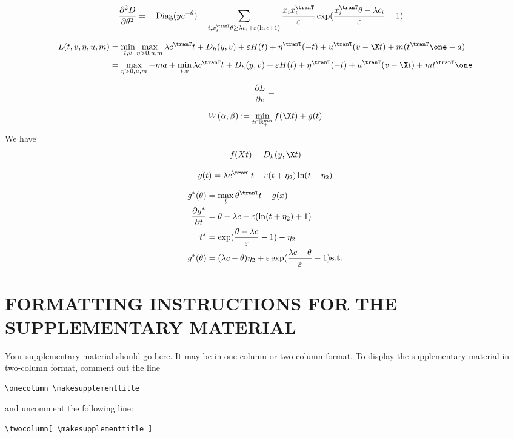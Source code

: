 $$
\begin{aligned}
\frac{\partial^{2} D}{\partial \theta^{2}} &=  -\operatorname{Diag}(ye^{-\theta}) -  \sum_{i,x_i^{\tranT}\theta\geq\lambda c_i +\varepsilon(\ln \epsilon + 1)} \frac{x_i x_i^{\tranT}}{\varepsilon}\exp(\frac{x_i^{\tranT}\theta-\lambda c_i}{\varepsilon}-1)
\end{aligned}
$$


$$
\begin{aligned}
L(t,v,\eta,u,m) &= \min_{t,v} \max_{\eta>0,u,m} \lambda c^{\tranT}t + D_h(y,v) + \varepsilon H(t) + \eta ^{\tranT} (-t) +u^{\tranT}(v-\X t) + m( t^{\tranT}\one - a)\\
&= \max_{\eta>0,u,m} -ma + \min_{t,v}  \lambda c^{\tranT}t + D_h(y,v) + \varepsilon H(t) + \eta ^{\tranT} (-t) +u^{\tranT}(v-\X t) + m t^{\tranT}\one 
\end{aligned}
$$

\begin{equation}
\frac{\partial L}{\partial v} = 
\end{equation}

\begin{equation}
W(\alpha,\beta) := \min_{t \in \mathbb{R}_{+}^{mn}} f(\X t) + g(t)
\end{equation}
We have 
$$
f(Xt) = D_h(y,\X t) 
$$

$$
g(t) = \lambda c^{\tranT}t +  \varepsilon (t +\eta_2) \ln (t+\eta_2)
$$

$$
\begin{aligned}
g^*(\theta) &= \max_{t} \theta^{\tranT} t - g(x)\\
\frac{\partial g^*}{\partial t} &= \theta - \lambda c - \varepsilon(\ln (t+\eta_2)+1) \\
t^* &= \exp (\frac{\theta - \lambda c}{\varepsilon}-1) - \eta_2\\
g^*(\theta) &= (\lambda c-\theta)\eta_2 + \varepsilon \exp(\frac{\lambda c-\theta}{\varepsilon}-1)
\mathbf{s.t.} 
\end{aligned}
$$

\section{FORMATTING INSTRUCTIONS FOR THE SUPPLEMENTARY MATERIAL}

Your supplementary material should go here. It may be in one-column or two-column format. To display the supplementary material in two-column format, comment out the line
\begin{verbatim}
\onecolumn \makesupplementtitle
\end{verbatim}
and uncomment the following line:
\begin{verbatim}
\twocolumn[ \makesupplementtitle ]
\end{verbatim}


